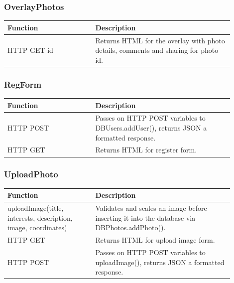 \subsubsection{OverlayPhotos}
\begin{minipage}{\linewidth}
  \centering
  \setlength{\tabcolsep}{12pt}
  \begin{tabular}{|p{0.35\linewidth}|p{0.55\linewidth}|}
  \hline
  \cellcolor{gray!25} Function & \cellcolor{gray!25} Description \\
  \hline
  HTTP GET id & Returns HTML for the overlay with photo details, comments and sharing for photo id. \\
  \hline
  \end{tabular}
\end{minipage}

\subsubsection{RegForm}
\begin{minipage}{\linewidth}
  \centering
  \setlength{\tabcolsep}{12pt}
  \begin{tabular}{|p{0.35\linewidth}|p{0.55\linewidth}|}
  \hline
  \cellcolor{gray!25} Function & \cellcolor{gray!25} Description \\
  \hline
  HTTP POST & Passes on HTTP POST variables to DBUsers.addUser(), returns JSON a formatted response. \\
  HTTP GET & Returns HTML for register form. \\
  \hline
  \end{tabular}
\end{minipage}

\subsubsection{UploadPhoto}
\begin{minipage}{\linewidth}
  \centering
  \setlength{\tabcolsep}{12pt}
  \begin{tabular}{|p{0.35\linewidth}|p{0.55\linewidth}|}
  \hline
  \cellcolor{gray!25} Function & \cellcolor{gray!25} Description \\
  \hline
  uploadImage(title, interests, description, image, coordinates) & Validates and scales an image before inserting it into the database via DBPhotos.addPhoto(). \\
  HTTP GET & Returns HTML for upload image form. \\
  HTTP POST & Passes on HTTP POST variables to uploadImage(), returns JSON a formatted response. \\
  \hline
  \end{tabular}
\end{minipage}

